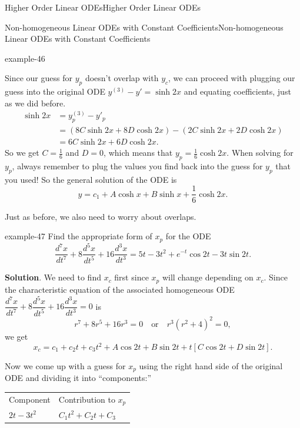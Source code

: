 \documentclass[10pt,]{book}
\numberwithin{equation}{section}
\newcommand{\hrulethick} {\noalign{\hrule height 0.11em}}
\newcommand{\dv}[3][]{\dfrac{d^{#1} #2}{d #3^{#1}}}
\newcommand{\brackets}[1]{\left[ #1 \right]}
\newcommand{\parens}[1]{\left( #1 \right)}
\newcommand{\amp}{&}
\begin{document}
\begin{chapterptx}{Higher Order Linear ODEs}{}{Higher Order Linear ODEs}{}{}
\begin{sectionptx}{Non-homogeneous Linear ODEs with Constant Coefficients}{}{Non-homogeneous Linear ODEs with Constant Coefficients}{}{}
\begin{example}{}{example-46}
\par
\hypertarget{p-286}{}%
Since our guess for \(y_{p}\) doesn't overlap with \(y_{c}\), we can proceed with plugging our guess into the original ODE \(y^{(3)}-y'=\sinh 2x\) and equating coefficients, just as we did before.%
\begin{align*}
\sinh 2x \amp= y^{(3)}_{p}-y'_{p}\\
\amp= \parens{8C\sinh2x+8D\cosh2x}-\parens{2C\sinh2x+2D\cosh2x}\\
\amp= 6C\sinh2x+6D\cosh2x.
\end{align*}
So we get \(C = \frac{1}{6}\) and \(D=0\), which means that \(y_{p} = \frac{1}{6}\cosh2x\). When solving for \(y_{p}\), always remember to plug the values you find back into the guess for \(y_{p}\) that you used! So the general solution of the ODE is%
\begin{equation*}
y = c_{1}+A\cosh x+B\sinh x+\frac{1}{6}\cosh2x.
\end{equation*}
%
\end{example}
\hypertarget{p-287}{}%
Just as before, we also need to worry about overlaps.%
\begin{example}{}{example-47}%
\hypertarget{p-288}{}%
Find the appropriate form of \(x_{p}\) for the ODE%
\begin{equation*}
\dv[7]{x}{t}+8\dv[5]{x}{t}+16\dv[3]{x}{t} = 5t-3t^{2}+e^{-t}\cos2t-3t\sin2t.
\end{equation*}
%
\par\smallskip%
\noindent\textbf{Solution}.\hypertarget{solution-44}{}\quad%
\hypertarget{p-289}{}%
We need to find \(x_{c}\) first since \(x_{p}\) will change depending on \(x_{c}\). Since the characteristic equation of the associated homogeneous ODE \(\dv[7]{x}{t}+8\dv[5]{x}{t}+16\dv[3]{x}{t}=0\) is%
\begin{equation*}
r^{7}+8r^{5}+16r^{3} = 0\quad\text{or}\quad r^{3}(r^{2}+4)^{2}=0,
\end{equation*}
we get%
\begin{equation*}
x_{c} = c_{1}+c_{2}t+c_{3}t^{2}+A\cos2t+B\sin2t + t\brackets{C\cos2t+D\sin2t}.
\end{equation*}
%
\par
\hypertarget{p-290}{}%
Now we come up with a guess for \(x_{p}\) using the right hand side of the original ODE and dividing it into ``components:''%
\begin{table}
\centering
\begin{tabular}{ll}\hrulethick
Component&Contribution to \(x_{p}\)\tabularnewline\hrulethick
\(2t-3t^{2}\)&\(C_{1}t^{2}+C_{2}t+C_{3}\)\tabularnewline[0pt]

\end{tabular}
\end{table}
\end{example}
\end{sectionptx}
\end{chapterptx}
\end{document}
